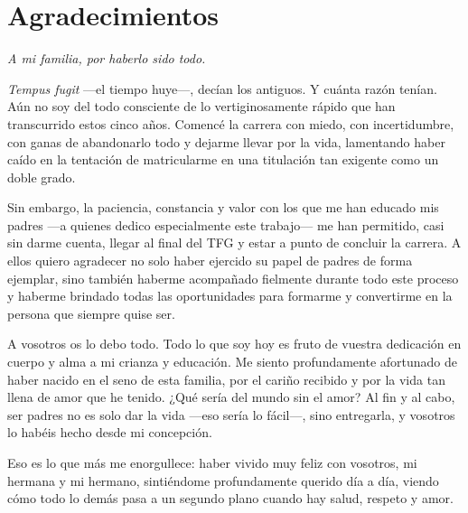 

\section*{Agradecimientos}

\begin{center}
\emph{A mi familia, por haberlo sido todo.}
\end{center}
\vspace{1cm}

\noindent
\textit{Tempus fugit} —el tiempo huye—, decían los antiguos. Y cuánta razón tenían. Aún no soy del todo consciente de lo vertiginosamente rápido que han transcurrido estos cinco años. Comencé la carrera con miedo, con incertidumbre, con ganas de abandonarlo todo y dejarme llevar por la vida, lamentando haber caído en la tentación de matricularme en una titulación tan exigente como un doble grado. \newline

Sin embargo, la paciencia, constancia y valor con los que me han educado mis padres —a quienes dedico especialmente este trabajo— me han permitido, casi sin darme cuenta, llegar al final del TFG y estar a punto de concluir la carrera. A ellos quiero agradecer no solo haber ejercido su papel de padres de forma ejemplar, sino también haberme acompañado fielmente durante todo este proceso y haberme brindado todas las oportunidades para formarme y convertirme en la persona que siempre quise ser. \newline

A vosotros os lo debo todo. Todo lo que soy hoy es fruto de vuestra dedicación en cuerpo y alma a mi crianza y educación. Me siento profundamente afortunado de haber nacido en el seno de esta familia, por el cariño recibido y por la vida tan llena de amor que he tenido. ¿Qué sería del mundo sin el amor? Al fin y al cabo, ser padres no es solo dar la vida —eso sería lo fácil—, sino entregarla, y vosotros lo habéis hecho desde mi concepción.

Eso es lo que más me enorgullece: haber vivido muy feliz con vosotros, mi hermana y mi hermano, sintiéndome profundamente querido día a día, viendo cómo todo lo demás pasa a un segundo plano cuando hay salud, respeto y amor. \newline

